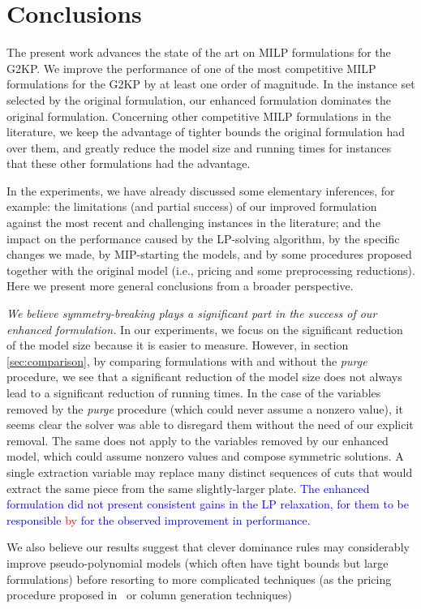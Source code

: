 \documentclass[ppgc,tese,english,formais,babel]{iiufrgs}
\newif\iffinalversion
\newcommand{\newtext}[1]{\iffinalversion%
#1%
\else%
\textcolor{blue}{#1}%
\fi%
}
\newcommand{\oldtext}[1]{\iffinalversion%
\else%
\textcolor{red}{#1}%
\fi%
}
\begin{document}




\chapter{Conclusions}
\label{sec:conclusions}

The present work advances the state of the art on MILP formulations for the G2KP.
We improve the performance of one of the most competitive MILP formulations for the G2KP by at least one order of magnitude.
In the instance set selected by the original formulation, our enhanced formulation dominates the original formulation.
Concerning other competitive MILP formulations in the literature, we keep the advantage of tighter bounds the original formulation had over them, and greatly reduce the model size and running times for instances that these other formulations had the advantage.

In the experiments, we have already discussed some elementary inferences, for example: the limitations (and partial success) of our improved formulation against the most recent and challenging instances in the literature; and the impact on the performance caused by the LP-solving algorithm, by the specific changes we made, by MIP-starting the models, and by some procedures proposed together with the original model (i.e., pricing and some preprocessing reductions).
Here we present more general conclusions from a broader perspective.

\emph{We believe symmetry-breaking plays a significant part in the success of our enhanced formulation.}
In our experiments, we focus on the significant reduction of the model size because it is easier to measure.
However, in section \cref{sec:comparison}, by comparing formulations with and without the \emph{purge} procedure, we see that a significant reduction of the model size does not always lead to a significant reduction of running times.
In the case of the variables removed by the \emph{purge} procedure (which could never assume a nonzero value), it seems clear the solver was able to disregard them without the need of our explicit removal.
The same does not apply to the variables removed by our enhanced model, which could assume nonzero values and compose symmetric solutions.
A single extraction variable may replace many distinct sequences of cuts that would extract the same piece from the same slightly-larger plate.
\newtext{The enhanced formulation did not present consistent gains in the LP relaxation, for them to be responsible \oldtext{by}\newtext{for} the observed improvement in performance.}
We also believe our results suggest that clever dominance rules may considerably improve pseudo-polynomial models (which often have tight bounds but large formulations) before resorting to more complicated techniques (as the pricing procedure proposed in~\citet{furini:2016} or column generation techniques)
\end{document}
